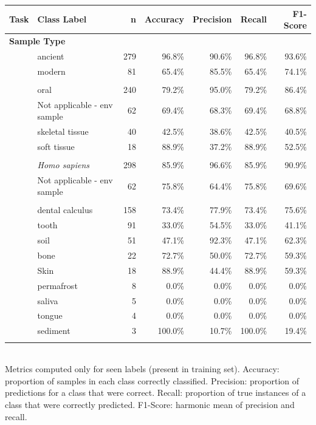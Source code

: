 \centering
\caption{Per-class performance on validation set (seen labels only)\label{tab:perclass_performance}}
\begin{tabular*}{\columnwidth}{@{\extracolsep{\fill}}llrrrrr@{\extracolsep{\fill}}}
\toprule
Task & Class Label & n & Accuracy & Precision & Recall & F1-Score \\
\midrule
\multicolumn{7}{l}{\textbf{Sample Type}} \\
\addlinespace[0.5em]
 & ancient & 279 & 96.8\% & 90.6\% & 96.8\% & 93.6\% \\
 & modern & 81 & 65.4\% & 85.5\% & 65.4\% & 74.1\% \\
\addlinespace
\multicolumn{7}{l}{\textbf{Community Type}} \\
\addlinespace[0.5em]
 & oral & 240 & 79.2\% & 95.0\% & 79.2\% & 86.4\% \\
 & Not applicable - env sample & 62 & 69.4\% & 68.3\% & 69.4\% & 68.8\% \\
 & skeletal tissue & 40 & 42.5\% & 38.6\% & 42.5\% & 40.5\% \\
 & soft tissue & 18 & 88.9\% & 37.2\% & 88.9\% & 52.5\% \\
\addlinespace
\multicolumn{7}{l}{\textbf{Sample Host}} \\
\addlinespace[0.5em]
 & \textit{Homo sapiens} & 298 & 85.9\% & 96.6\% & 85.9\% & 90.9\% \\
 & Not applicable - env sample & 62 & 75.8\% & 64.4\% & 75.8\% & 69.6\% \\
\addlinespace
\multicolumn{7}{l}{\textbf{Material}} \\
\addlinespace[0.5em]
 & dental calculus & 158 & 73.4\% & 77.9\% & 73.4\% & 75.6\% \\
 & tooth & 91 & 33.0\% & 54.5\% & 33.0\% & 41.1\% \\
 & soil & 51 & 47.1\% & 92.3\% & 47.1\% & 62.3\% \\
 & bone & 22 & 72.7\% & 50.0\% & 72.7\% & 59.3\% \\
 & Skin & 18 & 88.9\% & 44.4\% & 88.9\% & 59.3\% \\
 & permafrost & 8 & 0.0\% & 0.0\% & 0.0\% & 0.0\% \\
 & saliva & 5 & 0.0\% & 0.0\% & 0.0\% & 0.0\% \\
 & tongue & 4 & 0.0\% & 0.0\% & 0.0\% & 0.0\% \\
 & sediment & 3 & 100.0\% & 10.7\% & 100.0\% & 19.4\% \\
\addlinespace
\bottomrule
\end{tabular*}
\\[2mm]
{\footnotesize Metrics computed only for seen labels (present in training set). Accuracy: proportion of samples in each class correctly classified. Precision: proportion of predictions for a class that were correct. Recall: proportion of true instances of a class that were correctly predicted. F1-Score: harmonic mean of precision and recall.}